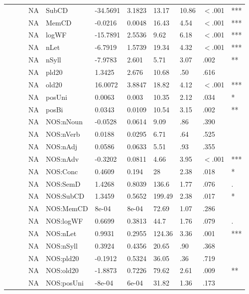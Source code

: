 \begin{table}[ht]
\begin{tabular}{lllllllllll}
   &  &  & NA & SubCD & -34.5691 & 3.1823 & 13.17 & 10.86 & $<$.001 & *** \\ 
   &  &  & NA & MemCD & -0.0216 & 0.0048 & 16.43 & 4.54 & $<$.001 & *** \\ 
   &  &  & NA & logWF & -15.7891 & 2.5536 & 9.62 & 6.18 & $<$.001 & *** \\ 
   &  &  & NA & nLet & -6.7919 & 1.5739 & 19.34 & 4.32 & $<$.001 & *** \\ 
   &  &  & NA & nSyll & -7.9783 & 2.601 & 5.71 & 3.07 & .002 & ** \\ 
   &  &  & NA & pld20 & 1.3425 & 2.676 & 10.68 & .50 & .616 &   \\ 
   &  &  & NA & old20 & 16.0072 & 3.8847 & 18.82 & 4.12 & $<$.001 & *** \\ 
   &  &  & NA & posUni & 0.0063 & 0.003 & 10.35 & 2.12 & .034 & * \\ 
   &  &  & NA & posBi & 0.0343 & 0.0109 & 10.54 & 3.15 & .002 & ** \\ 
   &  &  & NA & NOS:nNoun & -0.0528 & 0.0614 & 9.09 & .86 & .390 &   \\ 
   &  &  & NA & NOS:nVerb & 0.0188 & 0.0295 & 6.71 & .64 & .525 &   \\ 
   &  &  & NA & NOS:nAdj & 0.0586 & 0.0633 & 5.51 & .93 & .355 &   \\ 
   &  &  & NA & NOS:nAdv & -0.3202 & 0.0811 & 4.66 & 3.95 & $<$.001 & *** \\ 
   &  &  & NA & NOS:Conc & 0.4609 & 0.194 & 28 & 2.38 & .018 & * \\ 
   &  &  & NA & NOS:SemD & 1.4268 & 0.8039 & 136.6 & 1.77 & .076 & . \\ 
   &  &  & NA & NOS:SubCD & 1.3459 & 0.5652 & 199.49 & 2.38 & .017 & * \\ 
   &  &  & NA & NOS:MemCD & 8e-04 & 8e-04 & 72.69 & 1.07 & .286 &   \\ 
   &  &  & NA & NOS:logWF & 0.6699 & 0.3813 & 44.7 & 1.76 & .079 & . \\ 
   &  &  & NA & NOS:nLet & 0.9931 & 0.2955 & 124.36 & 3.36 & .001 & *** \\ 
   &  &  & NA & NOS:nSyll & 0.3924 & 0.4356 & 20.65 & .90 & .368 &   \\ 
   &  &  & NA & NOS:pld20 & -0.1912 & 0.5324 & 36.05 & .36 & .719 &   \\ 
   &  &  & NA & NOS:old20 & -1.8873 & 0.7226 & 79.62 & 2.61 & .009 & ** \\ 
   &  &  & NA & NOS:posUni & -8e-04 & 6e-04 & 31.82 & 1.36 & .173 &   \\ 

\end{tabular}
\end{table}
